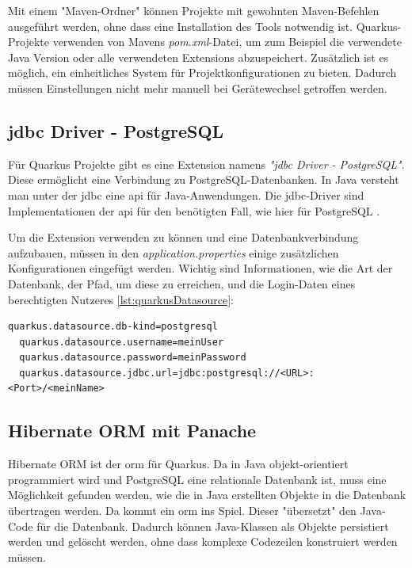 Mit einem "Maven-Ordner" können Projekte mit gewohnten Maven-Befehlen ausgeführt werden, ohne dass eine Installation des Tools notwendig ist.
Quarkus-Projekte verwenden von Mavens \emph{pom.xml}-Datei, um zum Beispiel die verwendete Java Version oder alle verwendeten Extensions abzuspeichert.
Zusätzlich ist es möglich, ein einheitliches System für Projektkonfigurationen zu bieten.
Dadurch müssen Einstellungen nicht mehr manuell bei Gerätewechsel getroffen werden. 
\cite{MavenAbout}


\subsection{\gls*{jdbc} Driver - PostgreSQL}
Für Quarkus Projekte gibt es eine Extension namens \textit{"\gls{jdbc} Driver - PostgreSQL"}.
Diese ermöglicht eine Verbindung zu PostgreSQL-Datenbanken. 
In Java versteht man unter der \gls{jdbc} eine \gls{api} für Java-Anwendungen. 
Die \gls{jdbc}-Driver sind Implementationen der \gls{api} für den benötigten Fall, wie hier für PostgreSQL \cite{StackOFJDBC}.


Um die Extension verwenden zu können und eine Datenbankverbindung aufzubauen, müssen in den \emph{application.properties} einige zusätzlichen Konfigurationen eingefügt werden. 
Wichtig sind Informationen, wie die Art der Datenbank, der Pfad, um diese zu erreichen, und die Login-Daten eines berechtigten Nutzeres \ref{lst:quarkusDatasource}:

\begin{lstlisting}[caption=Beispielkonfigurationen,label=lst:quarkusDatasource]
  quarkus.datasource.db-kind=postgresql 
  quarkus.datasource.username=meinUser
  quarkus.datasource.password=meinPassword
  quarkus.datasource.jdbc.url=jdbc:postgresql://<URL>:<Port>/<meinName>
\end{lstlisting}

\subsection{Hibernate ORM mit Panache}
Hibernate ORM ist der \gls{orm} für Quarkus. 
Da in Java objekt-orientiert programmiert wird und PostgreSQL eine relationale Datenbank ist, muss eine Möglichkeit gefunden werden, wie die in Java erstellten Objekte in die Datenbank übertragen werden. 
Da kommt ein \gls{orm} ins Spiel. 
Dieser "übersetzt" den Java-Code für die Datenbank. 
Dadurch können Java-Klassen als Objekte persistiert werden und gelöscht werden, ohne dass komplexe Codezeilen konstruiert werden müssen. 
\cite{ORMAbout}

